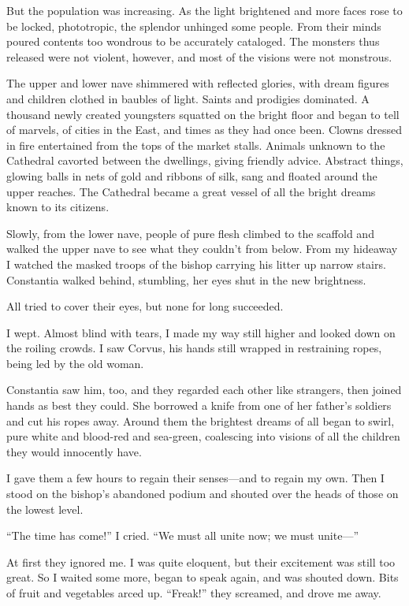 But the population was increasing. As the light brightened and more faces rose to be locked, phototropic, the splendor unhinged some people. From their minds poured contents too wondrous to be accurately cataloged. The monsters thus released were not violent, however, and most of the visions were not monstrous.

The upper and lower nave shimmered with reflected glories, with dream figures and children clothed in baubles of light. Saints and prodigies dominated. A thousand newly created youngsters squatted on the bright floor and began to tell of marvels, of cities in the East, and times as they had once been. Clowns dressed in fire entertained from the tops of the market stalls. Animals unknown to the Cathedral cavorted between the dwellings, giving friendly advice. Abstract things, glowing balls in nets of gold and ribbons of silk, sang and floated around the upper reaches. The Cathedral became a great vessel of all the bright dreams known to its citizens.

Slowly, from the lower nave, people of pure flesh climbed to the scaffold and walked the upper nave to see what they couldn’t from below. From my hideaway I watched the masked troops of the bishop carrying his litter up narrow stairs. Constantia walked behind, stumbling, her eyes shut in the new brightness.

All tried to cover their eyes, but none for long succeeded.

I wept. Almost blind with tears, I made my way still higher and looked down on the roiling crowds. I saw Corvus, his hands still wrapped in restraining ropes, being led by the old woman.

Constantia saw him, too, and they regarded each other like strangers, then joined hands as best they could. She borrowed a knife from one of her father’s soldiers and cut his ropes away. Around them the brightest dreams of all began to swirl, pure white and blood-red and sea-green, coalescing into visions of all the children they would innocently have.

I gave them a few hours to regain their senses—and to regain my own. Then I stood on the bishop’s abandoned podium and shouted over the heads of those on the lowest level.

“The time has come!” I cried. “We must all unite now; we must unite—”

At first they ignored me. I was quite eloquent, but their excitement was still too great. So I waited some more, began to speak again, and was shouted down. Bits of fruit and vegetables arced up. “Freak!” they screamed, and drove me away.

